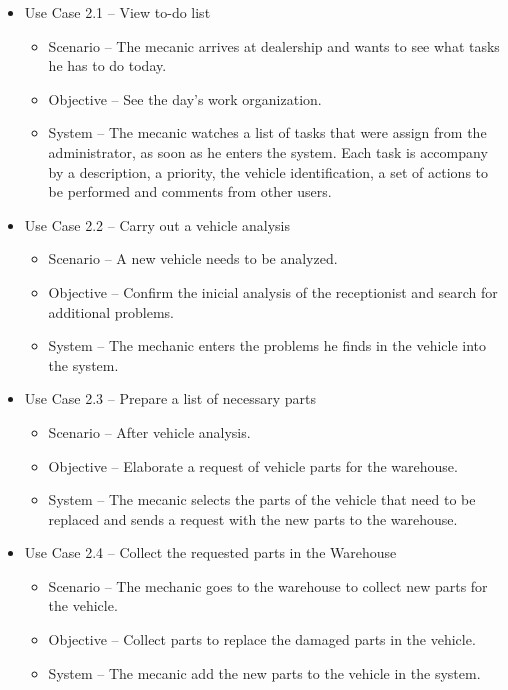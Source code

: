   \begin{itemize}
    \item Use Case 2.1 – View to-do list
    \begin{itemize}
      \item Scenario – The mecanic arrives at dealership and wants to see what tasks he has to do today.
      \item Objective – See the day's work organization.
      \item System – The mecanic watches a list of tasks that were assign from the administrator, as soon as he enters the system. Each task is accompany by a description, a priority, the vehicle identification, a set of actions to be performed and comments from other users. 
    \end{itemize}
    \item Use Case 2.2 – Carry out a vehicle analysis 
    \begin{itemize}
      \item Scenario – A new vehicle needs to be analyzed.
      \item Objective – Confirm the inicial analysis of the receptionist and search for additional problems.
      \item System – The mechanic enters the problems he finds in the vehicle into the system. 
    \end{itemize}
    \item Use Case 2.3 – Prepare a list of necessary parts
    \begin{itemize}
      \item Scenario – After vehicle analysis.
      \item Objective – Elaborate a request of vehicle parts for the warehouse.
      \item System – The mecanic selects the parts of the vehicle that need to be replaced and sends a request with the new parts to the warehouse.
    \end{itemize}
    \item Use Case 2.4 – Collect the requested parts in the Warehouse
    \begin{itemize}
      \item Scenario – The mechanic goes to the warehouse to collect new parts for the vehicle.
      \item Objective – Collect parts to replace the damaged parts in the vehicle.
      \item System – The mecanic add the new parts to the vehicle in the system.
    \end{itemize}

\end{itemize}
